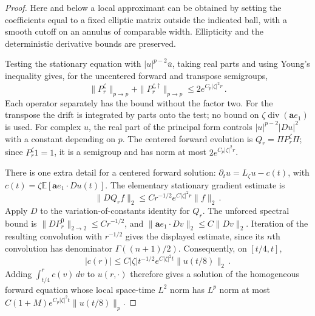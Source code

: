 \documentclass[11pt]{amsart}
\theoremstyle{definition}
\theoremstyle{remark}
\numberwithin{equation}{section}
\newcommand{\E}{\mathbb E}
\renewcommand{\a}{\mathbf a}
\newcommand{\diver}{\operatorname{div}}
\begin{document}
\begin{proof}
Here and below a local approximant can be obtained by setting the coefficients equal to a fixed elliptic matrix outside the indicated ball, with a smooth cutoff on an annulus of comparable width. Ellipticity and the deterministic derivative bounds are preserved.

Testing the stationary equation with $|u|^{p-2}\bar u$, taking real parts and using Young's inequality gives, for the uncentered forward and transpose semigroups,
\begin{equation}\label{e:lp-growth}
 \|P_r^\zeta\|_{p\to p}+\|P_r^{\zeta,\dagger}\|_{p\to p}
 \leq2e^{C_p|\zeta|^2r}\, .
\end{equation}
Each operator separately has the bound without the factor two. For the transpose the drift is integrated by parts onto the test; no bound on $\zeta\diver(\a e_1)$ is used. For complex $u$, the real part of the principal form controls $|u|^{p-2}|Du|^2$ with a constant depending on $p$. The centered forward evolution is $Q_r=\Pi P_r^\zeta\Pi$; since $P_r^\zeta1=1$, it is a semigroup and has norm at most $2e^{C_p|\zeta|^2r}$.

There is one extra detail for a centered forward solution: $\partial_tu=L_\zeta u-c(t)$, with $c(t)=\zeta\E[\a e_1\cdot Du(t)]$. The elementary stationary gradient estimate is
\begin{equation*}
 \|DQ_r f\|_2\leq Cr^{-1/2}e^{C|\zeta|^2r}\|f\|_2\, .
\end{equation*}
Apply $D$ to the variation-of-constants identity for $Q_r$. The unforced spectral bound is $\|DP_r^0\|_{2\to2}\leq Cr^{-1/2}$, and $\|\a e_1\cdot Dv\|_2\leq C\|Dv\|_2$. Iteration of the resulting convolution with $r^{-1/2}$ gives the displayed estimate, since its $n$th convolution has denominator $\Gamma((n+1)/2)$. Consequently, on $[t/4,t]$,
\begin{equation*}
 |c(r)|\leq C|\zeta|t^{-1/2}e^{C|\zeta|^2t}\|u(t/8)\|_2\, .
\end{equation*}
Adding $\int_{t/4}^r c(v)\,dv$ to $u(r,\cdot)$ therefore gives a solution of the homogeneous forward equation whose local space-time $L^2$ norm has $L^p$ norm at most $C(1+M)e^{C_p|\zeta|^2t}\|u(t/8)\|_p$.


\end{proof}
\end{document}
